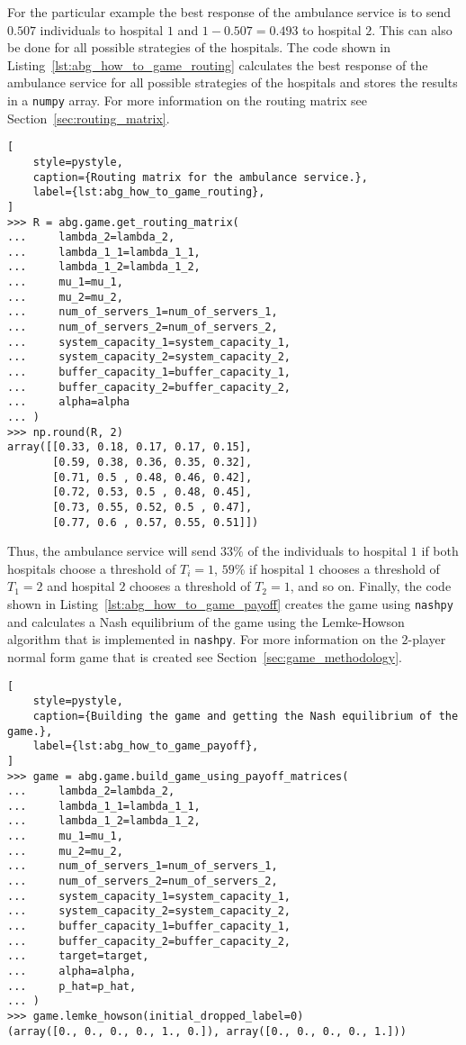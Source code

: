 For the particular example the best response of the ambulance service is
to send \(0.507\) individuals to hospital \(1\) and \(1 - 0.507 = 0.493\) to
hospital \(2\).
This can also be done for all possible strategies of the hospitals.
The code shown in Listing~\ref{lst:abg_how_to_game_routing} calculates the
best response of the ambulance service for all possible strategies of the
hospitals and stores the results in a \texttt{numpy} array.
For more information on the routing matrix see
Section~\ref{sec:routing_matrix}.

\begin{lstlisting}[
    style=pystyle,
    caption={Routing matrix for the ambulance service.},
    label={lst:abg_how_to_game_routing},
]
>>> R = abg.game.get_routing_matrix(
...     lambda_2=lambda_2,
...     lambda_1_1=lambda_1_1,
...     lambda_1_2=lambda_1_2,
...     mu_1=mu_1,
...     mu_2=mu_2,
...     num_of_servers_1=num_of_servers_1,
...     num_of_servers_2=num_of_servers_2,
...     system_capacity_1=system_capacity_1,
...     system_capacity_2=system_capacity_2,
...     buffer_capacity_1=buffer_capacity_1,
...     buffer_capacity_2=buffer_capacity_2,
...     alpha=alpha
... )
>>> np.round(R, 2)
array([[0.33, 0.18, 0.17, 0.17, 0.15],
       [0.59, 0.38, 0.36, 0.35, 0.32],
       [0.71, 0.5 , 0.48, 0.46, 0.42],
       [0.72, 0.53, 0.5 , 0.48, 0.45],
       [0.73, 0.55, 0.52, 0.5 , 0.47],
       [0.77, 0.6 , 0.57, 0.55, 0.51]])

\end{lstlisting}

Thus, the ambulance service will send \(33\%\) of the individuals to hospital
\(1\) if both hospitals choose a threshold of \(T_i = 1\), \(59\%\) if hospital
\(1\) chooses a threshold of \(T_1 = 2\) and hospital \(2\) chooses a threshold
of \(T_2 = 1\), and so on.
Finally, the code shown in Listing~\ref{lst:abg_how_to_game_payoff} creates the
game using \texttt{nashpy} and calculates a Nash equilibrium of the game
using the Lemke-Howson algorithm that is implemented in \texttt{nashpy}.
For more information on the \(2\)-player normal form game that is created
see Section~\ref{sec:game_methodology}.

\begin{lstlisting}[
    style=pystyle,
    caption={Building the game and getting the Nash equilibrium of the game.},
    label={lst:abg_how_to_game_payoff},
]
>>> game = abg.game.build_game_using_payoff_matrices(
...     lambda_2=lambda_2,
...     lambda_1_1=lambda_1_1,
...     lambda_1_2=lambda_1_2,
...     mu_1=mu_1,
...     mu_2=mu_2,
...     num_of_servers_1=num_of_servers_1,
...     num_of_servers_2=num_of_servers_2,
...     system_capacity_1=system_capacity_1,
...     system_capacity_2=system_capacity_2,
...     buffer_capacity_1=buffer_capacity_1,
...     buffer_capacity_2=buffer_capacity_2,
...     target=target,
...     alpha=alpha,
...     p_hat=p_hat,
... )
>>> game.lemke_howson(initial_dropped_label=0)
(array([0., 0., 0., 0., 1., 0.]), array([0., 0., 0., 0., 1.]))
    
\end{lstlisting}


